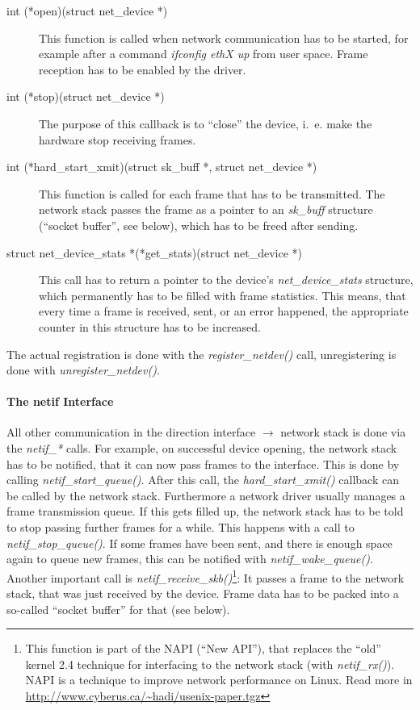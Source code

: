 \documentclass[a4paper,12pt,BCOR6mm,bibtotoc,idxtotoc]{scrbook}
\begin{document}
\begin{description}
\item[int (*open)(struct net\_device *)] This function is called when
  network communication has to be started, for example after a command
  \textit{ifconfig ethX up} from user space. Frame reception has to be
  enabled by the driver.
\item[int (*stop)(struct net\_device *)] The purpose of this callback
  is to ``close'' the device, i.~e. make the hardware stop receiving
  frames.
\item[int (*hard\_start\_xmit)(struct sk\_buff *, struct net\_device
  *)] This function is cal\-led for each frame that has to be
  transmitted.  The network stack passes the frame as a pointer to an
  \textit{sk\_buff} structure (``socket buffer'',
  see below), which has to be freed after sending.
\item[struct net\_device\_stats *(*get\_stats)(struct net\_device *)]
  This call has to return a pointer to the device's
  \textit{net\_device\_stats} structure, which permanently has to be
  filled with frame statistics. This means, that every time a frame is
  received, sent, or an error happened, the appropriate counter in
  this structure has to be increased.
\end{description}

The actual registration is done with the \textit{register\_netdev()}
call, unregistering is done with \textit{unregister\_netdev()}.

\paragraph{The netif Interface}

All other communication in the direction interface $\to$ network stack is done
via the \textit{netif\_*} calls. For example, on successful device opening, the
network stack has to be notified, that it can now pass frames to the interface.
This is done by calling \textit{netif\_start\_queue()}. After this call, the
\textit{hard\_start\_xmit()} callback can be called by the network stack.
Furthermore a network driver usually manages a frame transmission queue. If
this gets filled up, the network stack has to be told to stop passing further
frames for a while. This happens with a call to \textit{netif\_stop\_queue()}.
If some frames have been sent, and there is enough space again to queue new
frames, this can be notified with \textit{netif\_wake\_queue()}. Another
important call is \textit{netif\_receive\_skb()}\footnote{This function is part
of the NAPI (``New API''), that replaces the ``old'' kernel 2.4 technique for
interfacing to the network stack (with \textit{netif\_rx()}).  NAPI is a
technique to improve network performance on Linux. Read more in
\url{http://www.cyberus.ca/~hadi/usenix-paper.tgz}}: It passes a frame to the
network stack, that was just received by the device.  Frame data has to be
packed into a so-called ``socket buffer'' for that (see below).
\end{document}
